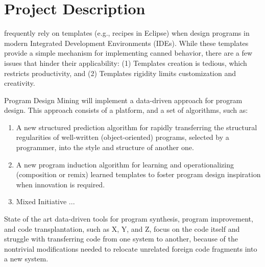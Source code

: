 \chapter{Project Description}{}
\label{sec:related}

 frequently rely on templates (e.g., 
recipes in Eclipse) when design programs in modern Integrated 
Development Environments (IDEs). While these templates provide 
a simple mechanism for implementing canned behavior, there are a 
few issues that hinder their applicability: (1) Templates creation 
is tedious, which restricts productivity, and (2) Templates rigidity 
limits customization and creativity.

Program Design Mining will implement a data-driven approach for 
program design. This approach consists of a platform, and a set of 
algorithms, such as: 

\begin{enumerate}
	\item A new structured prediction algorithm for rapidly transferring 
	the structural regularities of well-written (object-oriented) programs, 
	selected by a programmer, into the style and structure of another one.
	\item A new program induction algorithm for learning and operationalizing 
	(composition or remix) learned templates to foster program design 
	inspiration when innovation is required.
	\item Mixed Initiative ...
\end{enumerate}

State of the art data-driven tools for program synthesis, program 
improvement, and code transplantation, such as X, Y, and Z, focus 
on the code itself and struggle with transferring code from one system 
to another, because of the nontrivial modifications needed to relocate 
unrelated foreign code fragments into a new system. 